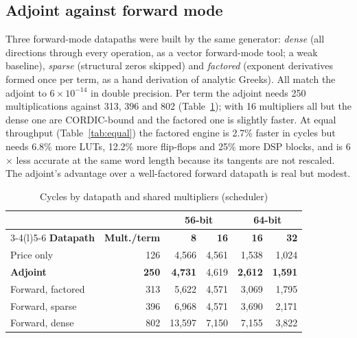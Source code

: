 \documentclass[conference]{IEEEtran}
\begin{document}
\subsection{Adjoint against forward mode}
\label{sec:res-modes}
Three forward-mode datapaths were built by the same generator: \emph{dense} (all directions through
every operation, as a vector forward-mode tool; a weak baseline), \emph{sparse} (structural zeros
skipped) and \emph{factored} (exponent derivatives formed once per term, as a hand derivation of
analytic Greeks). All match the adjoint to $6\times10^{-14}$ in double precision. Per term the adjoint
needs 250 multiplications against 313, 396 and 802 (Table~\ref{tab:modes}); with 16 multipliers all but
the dense one are CORDIC-bound and the factored one is slightly faster. At equal throughput
(Table~\ref{tab:equal}) the factored engine is 2.7\% faster in cycles but needs 6.8\% more LUTs, 12.2\%
more flip-flops and 25\% more DSP blocks, and is 6$\times$ less accurate at the same word length because
its tangents are not rescaled. The adjoint's advantage over a well-factored forward datapath is real but
modest.

\begin{table}[!t]
\centering
\caption{Cycles by datapath and shared multipliers (scheduler)}
\label{tab:modes}
\footnotesize
\setlength{\tabcolsep}{3pt}
\begin{tabular}{@{}lrrrrr@{}}
\toprule
& & \multicolumn{2}{c}{\textbf{56-bit}} & \multicolumn{2}{c}{\textbf{64-bit}}\\
\cmidrule(lr){3-4}\cmidrule(l){5-6}
\textbf{Datapath} & \textbf{Mult./term} & \textbf{8} & \textbf{16} & \textbf{16} & \textbf{32}\\
\midrule
Price only & 126 & 4,566 & 4,561 & 1,538 & 1,024\\
\textbf{Adjoint} & \textbf{250} & \textbf{4,731} & 4,619 & \textbf{2,612} & \textbf{1,591}\\
Forward, factored & 313 & 5,622 & 4,571 & 3,069 & 1,795\\
Forward, sparse & 396 & 6,968 & 4,571 & 3,690 & 2,171\\
Forward, dense & 802 & 13,597 & 7,150 & 7,155 & 3,822\\
\bottomrule
\end{tabular}
\end{table}
\end{document}
